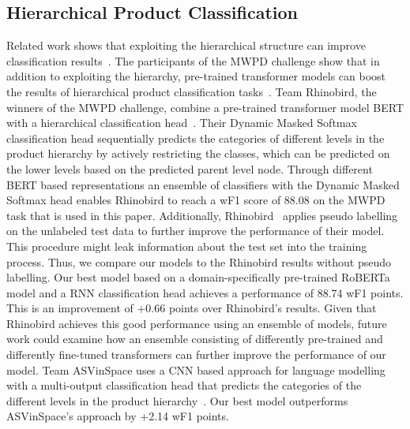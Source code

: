 \documentclass[11pt,dvipdfm]{article}
\begin{document}
\subsection{Hierarchical Product Classification}
Related work shows that exploiting the hierarchical structure can improve classification results~\cite{gao_deep_2020, silla_survey_2011, yang_bert_2020, wehrmann_hierarchical_2018, you_attentionxml_2019}.
The participants of the \ac{MWPD} challenge show that in addition to exploiting the hierarchy, pre-trained transformer models can boost the results of hierarchical product classification tasks~\cite{zhang_mwpd2020_2020}.
Team Rhinobird, the winners of the \ac{MWPD} challenge, combine a pre-trained transformer model BERT with a hierarchical classification head~\cite{yang_bert_2020}.
Their Dynamic Masked Softmax classification head sequentially predicts the categories of different levels in the product hierarchy by actively restricting the classes, which can be predicted on the lower levels based on the predicted parent level node.
Through different BERT based representations an ensemble of classifiers with the Dynamic Masked Softmax head enables Rhinobird to reach a \ac{wF1} score of 88.08 on the MWPD task that is used in this paper.
Additionally, Rhinobird~\cite{yang_bert_2020} applies pseudo labelling on the unlabeled test data to further improve the performance of their model.
This procedure might leak information about the test set into the training process. 
Thus, we compare our models to the Rhinobird results without pseudo labelling. 
Our best model based on a domain-specifically pre-trained RoBERTa model and a \ac{RNN} classification head achieves a performance of 88.74 \ac{wF1} points.
This is an improvement of +0.66 points over Rhinobird's results.
Given that Rhinobird achieves this good performance using an ensemble of models, future work could examine how an ensemble consisting of differently pre-trained and differently fine-tuned transformers can further improve the performance of our model.
Team ASVinSpace uses a CNN based approach for language modelling with a multi-output classification head that predicts the categories of the different levels in the product hierarchy~\cite{borst_language_2020}.
Our best model outperforms ASVinSpace's approach by +2.14 \ac{wF1} points.
\end{document}
